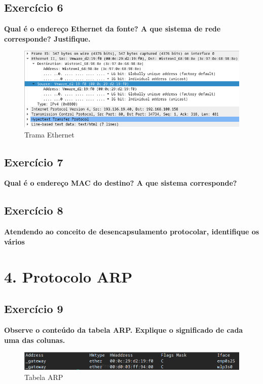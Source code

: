 \documentclass[a4paper]{report}
\begin{document}
\section{Exercício 6}
\textbf{Qual é o endereço Ethernet da fonte? A que sistema de rede corresponde?
Justifique.}

\begin{figure}[H]
    \centering 
    \includegraphics[width=\textwidth]{images/678.png}
    \caption{Trama Ethernet}
    \label{fig:678}
\end{figure}


\section{Exercício 7}
\textbf{Qual é o endereço MAC do destino? A que sistema corresponde?}


\section{Exercício 8}
\textbf{Atendendo ao conceito de desencapsulamento protocolar, identifique os
vários}


\chapter{4. Protocolo ARP}
\section{Exercício 9}
\textbf{Observe o conteúdo da tabela ARP. Explique o significado de cada uma
das colunas.}

\begin{figure}[H]
    \centering 
    \includegraphics[width=\textwidth]{images/tabelaArp.png}
    \caption{Tabela ARP}
    \label{fig:tabelaArp}
\end{figure}
\end{document}
